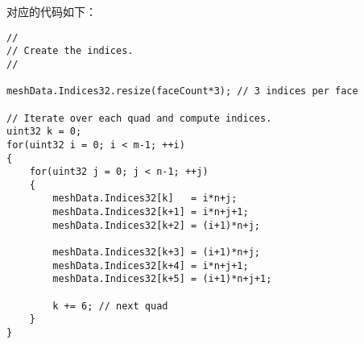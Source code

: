 \begin{flushleft}
对应的代码如下：\\
\end{flushleft}

\begin{lstlisting}
//
// Create the indices.
//

meshData.Indices32.resize(faceCount*3); // 3 indices per face

// Iterate over each quad and compute indices.
uint32 k = 0;
for(uint32 i = 0; i < m-1; ++i)
{
    for(uint32 j = 0; j < n-1; ++j)
    {
        meshData.Indices32[k]   = i*n+j;
        meshData.Indices32[k+1] = i*n+j+1;
        meshData.Indices32[k+2] = (i+1)*n+j;

        meshData.Indices32[k+3] = (i+1)*n+j;
        meshData.Indices32[k+4] = i*n+j+1;
        meshData.Indices32[k+5] = (i+1)*n+j+1;

        k += 6; // next quad
    }
}
\end{lstlisting}

